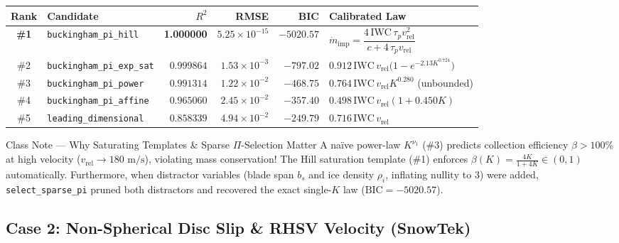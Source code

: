 \documentclass[11pt,a4paper]{article}
\begin{document}
\begin{center}
\renewcommand{\arraystretch}{1.2}
\small
\begin{tabular}{@{}clrrrl@{}}
\toprule
\textbf{Rank} & \textbf{Candidate} & \textbf{$R^2$} & \textbf{RMSE} & \textbf{BIC} & \textbf{Calibrated Law} \\
\midrule
\textbf{\#1} & \texttt{buckingham\_pi\_hill} & \textbf{1.000000} & \textbf{$5.25\times 10^{-15}$} & \textbf{$-5020.57$} & $\dot{m}_{\text{imp}} = \dfrac{4\,\text{IWC}\,\tau_p v_{\text{rel}}^2}{c + 4\,\tau_p v_{\text{rel}}}$ \\
\#2 & \texttt{buckingham\_pi\_exp\_sat} & $0.999864$ & $1.53\times 10^{-3}$ & $-797.02$ & $0.912\,\text{IWC}\,v_{\text{rel}}\bigl(1 - e^{-2.13 K^{0.724}}\bigr)$ \\
\#3 & \texttt{buckingham\_pi\_power} & $0.991314$ & $1.22\times 10^{-2}$ & $-468.75$ & $0.764\,\text{IWC}\,v_{\text{rel}} K^{0.280}$ (unbounded) \\
\#4 & \texttt{buckingham\_pi\_affine} & $0.965060$ & $2.45\times 10^{-2}$ & $-357.40$ & $0.498\,\text{IWC}\,v_{\text{rel}}(1 + 0.450 K)$ \\
\#5 & \texttt{leading\_dimensional} & $0.858339$ & $4.94\times 10^{-2}$ & $-249.79$ & $0.716\,\text{IWC}\,v_{\text{rel}}$ \\
\bottomrule
\end{tabular}
\end{center}

\begin{insightbox}{Class Note — Why Saturating Templates \& Sparse $\Pi$-Selection Matter}
A naïve power-law $K^{\nu_1}$ (\#3) predicts collection efficiency $\beta > 100\%$ at high velocity ($v_{\text{rel}} \to 180\text{ m/s}$), violating mass conservation! The Hill saturation template (\#1) enforces $\beta(K) = \frac{4K}{1+4K} \in (0,1)$ automatically. Furthermore, when distractor variables (blade span $b_s$ and ice density $\rho_i$, inflating $\text{nullity}$ to $3$) were added, \texttt{select\_sparse\_pi} pruned both distractors and recovered the exact single-$K$ law ($\text{BIC} = -5020.57$).
\end{insightbox}

\subsection{Case 2: Non-Spherical Disc Slip \& RHSV Velocity (SnowTek)}
\end{document}
